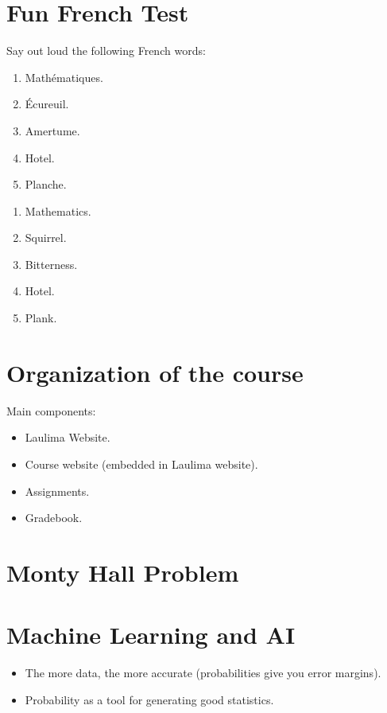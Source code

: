 \documentclass[12pt, xcolor=dvipsnames]{beamer}
\begin{document}
\section{Fun French Test}

	\begin{frame}
	Say out loud the following French words:

	\bigskip 

		\begin{minipage}{0.45\textwidth}
		\begin{enumerate}
			\item Mathématiques.
			\item Écureuil.
			\item Amertume.
			\item Hotel.
			\item Planche.
		\end{enumerate}
		\end{minipage}
		\begin{minipage}{0.45\textwidth}
		\begin{enumerate}
			\item<2-6> Mathematics.
			\item<3-6> Squirrel.
			\item<4-6> Bitterness.
			\item<5-6> Hotel.
			\item<6> Plank.
		\end{enumerate}
		\end{minipage}

	\end{frame}

\section{Organization of the course}

	\begin{frame}
	Main components:
		\begin{itemize}
			\item Laulima Website.
			\item Course website (embedded in Laulima website).
			\item Assignments.
			\item Gradebook.
		\end{itemize}
	\end{frame}

\section{Monty Hall Problem}

	\begin{frame}

	\end{frame}

\section{Machine Learning and AI}

	\begin{frame}
	\begin{itemize}
		\item The more data, the more accurate (probabilities give you error margins).
		\item Probability as a tool for generating good statistics. 
	\end{itemize}

	\end{frame}
\end{document}

